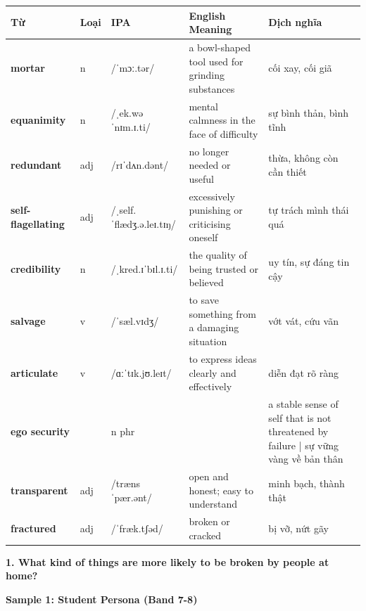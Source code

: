 \vspace{0.8em}
\begin{center}
\renewcommand{\arraystretch}{1.65}
\begin{tabularx}{\textwidth}{|V{0.22\textwidth}|C{0.07\textwidth}|I{0.20\textwidth}|Y|V{0.18\textwidth}|}
\hline
{}
\textbf{Từ} & \textbf{Loại} & \textbf{IPA} & \textbf{English Meaning} & \textbf{Dịch nghĩa} \\
\hline
\textbf{mortar} & n & /ˈmɔː.tər/ & a bowl-shaped tool used for grinding substances & cối xay, cối giã \\ \hline
\textbf{equanimity} & n & /ˌek.wəˈnɪm.ɪ.ti/ & mental calmness in the face of difficulty & sự bình thản, bình tĩnh \\ \hline
\textbf{redundant} & adj & /rɪˈdʌn.dənt/ & no longer needed or useful & thừa, không còn cần thiết \\ \hline
\textbf{self-flagellating} & adj & /ˌself.ˈflædʒ.ə.leɪ.tɪŋ/ & excessively punishing or criticising oneself & tự trách mình thái quá \\ \hline
\textbf{credibility} & n & /ˌkred.ɪˈbɪl.ɪ.ti/ & the quality of being trusted or believed & uy tín, sự đáng tin cậy \\ \hline
\textbf{salvage} & v & /ˈsæl.vɪdʒ/ & to save something from a damaging situation & vớt vát, cứu vãn \\ \hline
\textbf{articulate} & v & /ɑːˈtɪk.jʊ.leɪt/ & to express ideas clearly and effectively & diễn đạt rõ ràng \\ \hline
\textbf{ego security} & & n phr & & a stable sense of self that is not threatened by failure | sự vững vàng về bản thân \\ \hline
\textbf{transparent} & adj & /trænsˈpær.ənt/ & open and honest; easy to understand & minh bạch, thành thật \\ \hline
\textbf{fractured} & adj & /ˈfræk.tʃəd/ & broken or cracked & bị vỡ, nứt gãy \\ \hline
\end{tabularx}
\end{center}

\partthreeheader

\begin{ieltsquestion}
\textbf{1. What kind of things are more likely to be broken by people at home?}
\end{ieltsquestion}
\textbf{Sample 1: Student Persona (Band 7-8)}

